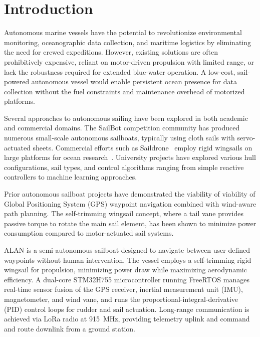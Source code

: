 \section{Introduction}
\label{sec:intro}

Autonomous marine vessels have the potential to revolutionize environmental
monitoring, oceanographic data collection, and maritime logistics by
eliminating the need for crewed expeditions. However, existing solutions are
often prohibitively expensive, reliant on motor-driven propulsion with limited
range, or lack the robustness required for extended blue-water operation. A
low-cost, sail-powered autonomous vessel would enable persistent ocean
presence for data collection without the fuel constraints and maintenance
overhead of motorized platforms.

Several approaches to autonomous sailing have been explored in both academic
and commercial domains. The SailBot competition community has produced
numerous small-scale autonomous sailboats, typically using cloth sails with
servo-actuated sheets. Commercial efforts such as Saildrone~\cite{saildrone}
employ rigid wingsails on large platforms for ocean
research~\cite{meinig2019}. University projects have explored various hull
configurations, sail types, and control algorithms ranging from simple
reactive controllers to machine learning approaches.

Prior autonomous sailboat projects have demonstrated the viability of viability of Global Positioning System (GPS)
waypoint navigation combined with wind-aware path planning. The
self-trimming wingsail concept, where a tail vane provides passive torque to
rotate the main sail element, has been shown to minimize power consumption
compared to motor-actuated sail systems.

ALAN is a semi-autonomous sailboat designed to navigate between
user-defined waypoints without human intervention. The vessel employs a
self-trimming rigid wingsail for propulsion, minimizing power draw while
maximizing aerodynamic efficiency. A dual-core STM32H755 microcontroller
running FreeRTOS manages real-time sensor fusion of the GPS receiver,
inertial measurement unit (IMU), magnetometer, and wind vane, and runs the
proportional-integral-derivative (PID) control loops for rudder and sail
actuation. Long-range communication is achieved via LoRa radio at \SI{915}{\mega\hertz}, providing
telemetry uplink and command and route downlink from a ground station.

